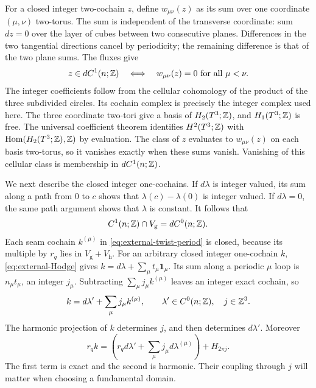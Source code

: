 For a closed integer two-cochain $z$, define
$w_{\mu\nu}(z)$ as its sum over one coordinate $(\mu,\nu)$
two-torus. The sum is independent of the transverse coordinate:
sum $dz=0$ over the layer of cubes between two consecutive
planes. Differences in the two tangential directions cancel
by periodicity; the remaining difference is that of the two
plane sums. The fluxes give
\begin{equation}\label{eq:external-integer-two-exactness}
 z\in dC^1(n;\mathbb Z)\quad\Longleftrightarrow\quad
                         w_{\mu\nu}(z)=0\ \text{for all }\mu<\nu.
\end{equation}
The integer coefficients follow from the
cellular cohomology of the product of the three subdivided
circles. Its cochain complex is precisely the integer complex
used here. The three coordinate two-tori give a basis of
$H_2(T^3;\mathbb Z)$, and $H_1(T^3;\mathbb Z)$ is free. The universal
coefficient theorem identifies $H^2(T^3;\mathbb Z)$ with
$\operatorname{Hom}(H_2(T^3;\mathbb Z),\mathbb Z)$ by evaluation.
The class of $z$ evaluates to $w_{\mu\nu}(z)$ on each basis
two-torus, so it vanishes exactly when these sums vanish.
Vanishing of this cellular class is membership in
$dC^1(n;\mathbb Z)$.
\cite[Theorems~3.2, 3.5 and~3B.6]{Hatcher2002}

We next describe the closed integer one-cochains. If $d\lambda$
is integer valued, its sum along a path from $0$ to $c$ shows
that $\lambda(c)-\lambda(0)$ is integer valued. If $d\lambda=0$,
the same path argument shows that $\lambda$ is constant.
It follows that
\[
 C^1(n;\mathbb Z)\cap V_{\mathrm g}=dC^0(n;\mathbb Z).
\]
Each seam cochain $k^{(\mu)}$ in
\eqref{eq:external-twist-period} is closed, because its
multiple by $r_q$ lies in $V_{\mathrm g}+V_{\mathrm h}$.
For an arbitrary closed integer one-cochain $k$,
\eqref{eq:external-Hodge} gives
$k=d\lambda+\sum_\mu t_\mu\mathbf1_\mu$.
Its sum along a periodic $\mu$ loop is $n_\mu t_\mu$,
an integer $j_\mu$. Subtracting
$\sum_\mu j_\mu k^{(\mu)}$ leaves an integer exact cochain,
so
\begin{equation}\label{eq:external-closed-integer-one}
 k=d\lambda'+\sum_\mu j_\mu k^{(\mu)},\qquad
 \lambda'\in C^0(n;\mathbb Z),\quad j\in\mathbb Z^3.
\end{equation}
The harmonic projection of $k$ determines $j$, and then
determines $d\lambda'$. Moreover
\begin{equation}\label{eq:external-integer-Hodge}
 r_qk=
   \left(r_qd\lambda'+\sum_\mu j_\mu d\lambda^{(\mu)}\right)
                         +H_{2\pi j}.
\end{equation}
The first term is exact and the second is harmonic. Their
coupling through $j$ will matter when choosing a fundamental
domain.

